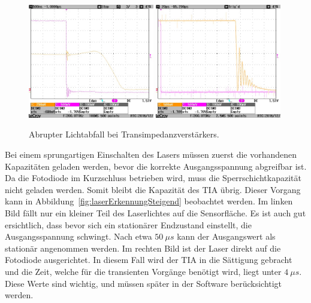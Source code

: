 \begin{figure} \centering
	\includegraphics[width=0.49\textwidth]{img/PicturesPlots/Fotodiodes/LaserSchwach/Fallend/COPY/CONVERT/SCRN0135_Cutted.jpg}
	\includegraphics[width=0.49\textwidth]{img/PicturesPlots/Fotodiodes/LaserMaximal/Fallend/COPY/CONVERT/SCRN0142_Cutted.jpg}
	\caption{Abrupter Lichtabfall bei Transimpedanzverstärkers.}
	\label{fig:laserErkennungFallend}
\end{figure}

Bei einem sprungartigen Einschalten des Lasers müssen zuerst die vorhandenen Kapazitäten geladen werden, bevor die korrekte Ausgangsspannung abgreifbar ist.
Da die Fotodiode im Kurzschluss betrieben wird, muss die Sperrschichtkapazität nicht geladen werden. Somit bleibt die Kapazität des TIA übrig.
Dieser Vorgang kann in Abbildung~\ref{fig:laserErkennungSteigend} beobachtet werden.
Im linken Bild fällt nur ein kleiner Teil des Laserlichtes auf die Sensorfläche.
Es ist auch gut ersichtlich, dass bevor sich ein stationärer Endzustand einstellt, die Ausgangsspannung schwingt.
Nach etwa $50~\mu s$ kann der Ausgangswert als stationär angenommen werden.
Im rechten Bild ist der Laser direkt auf die Fotodiode ausgerichtet.
In diesem Fall wird der TIA in die Sättigung gebracht und die Zeit, welche für die transienten Vorgänge benötigt wird, liegt unter $4~\mu s$.
Diese Werte sind wichtig, und müssen später in der Software berücksichtigt werden.

